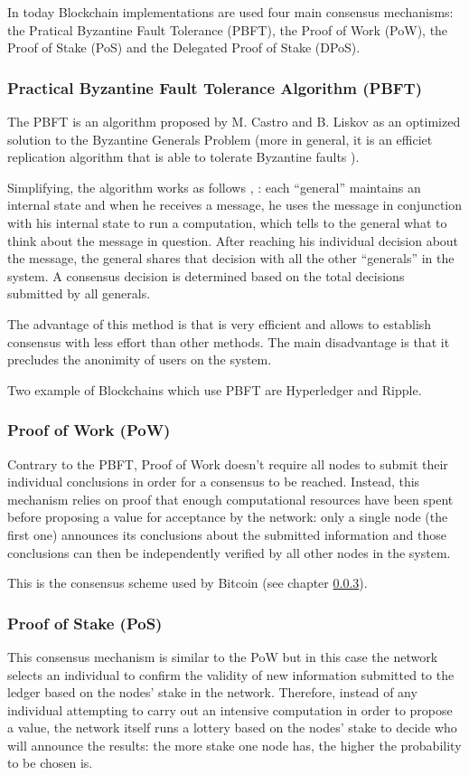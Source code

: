 In today Blockchain implementations are used four main consensus mechanisms:
the Pratical Byzantine Fault Tolerance (PBFT), the Proof of Work (PoW),
the Proof of Stake (PoS) and the Delegated Proof of Stake (DPoS).

\subsubsection{Practical Byzantine Fault Tolerance Algorithm (PBFT)}
The PBFT is an algorithm proposed by M. Castro and B. Liskov as an optimized solution
to the Byzantine Generals Problem (more in general, it is an efficiet replication
algorithm that is able to tolerate Byzantine faults \cite{castro1999practical}).

Simplifying, the algorithm works as follows \cite{blockchain-consensus-medium},
\cite{castro1999practical}: each ``general'' maintains an
internal state and when he receives a message, he uses the message in
conjunction with his internal state to run a computation, which tells to the
general what to think about the message in question.
After reaching his individual decision about the message, the general shares that
decision with all the other ``generals'' in the system.
A consensus decision is determined based on the total decisions submitted by all
generals.


The advantage of this method is that is very efficient and allows to establish
consensus with less effort than other methods. The main disadvantage is that it
precludes the anonimity of users on the system.

Two example of Blockchains which use PBFT are Hyperledger and Ripple.

\subsubsection{Proof of Work (PoW)}
Contrary to the PBFT, Proof of Work doesn't require all nodes to submit their
individual conclusions in order for a consensus to be reached. Instead, this
mechanism relies on proof that enough computational resources have been spent
before proposing a value for acceptance by the network: only a single node (the first one)
announces its conclusions about the submitted information and those conclusions
can then be independently verified by all other nodes in the system.

This is the consensus scheme used by Bitcoin (see chapter \ref{}).

\subsubsection{Proof of Stake (PoS)}
This consensus mechanism is similar to the PoW but in this case the network
selects an individual to confirm the validity of new information submitted to
the ledger based on the nodes' stake in the network. Therefore, instead of any
individual attempting to carry out an intensive computation in order to propose
a value, the network itself runs a lottery based on the nodes' stake to decide
who will announce the results: the more stake one node has, the higher the probability
to be chosen is.

